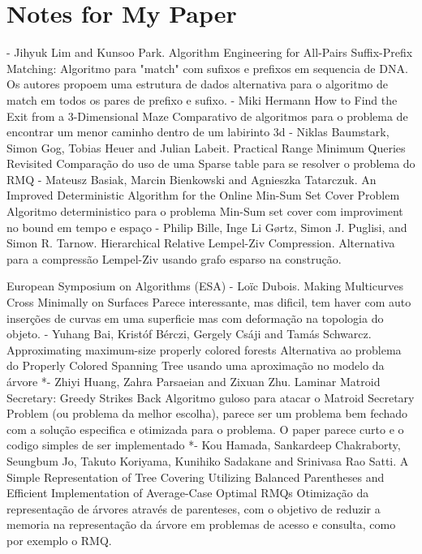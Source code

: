 \documentclass[12pt]{article}
\begin{document}
\section*{Notes for My Paper}

- Jihyuk Lim and Kunsoo Park. Algorithm Engineering for All-Pairs Suffix-Prefix Matching:
    Algoritmo para "match" com sufixos e prefixos em sequencia de DNA. Os autores propoem uma estrutura de dados alternativa
    para o algoritmo de match em todos os pares de prefixo e sufixo. 
- Miki Hermann How to Find the Exit from a 3-Dimensional Maze
    Comparativo de algoritmos para o problema de encontrar um menor caminho dentro de um labirinto 3d
- Niklas Baumstark, Simon Gog, Tobias Heuer and Julian Labeit. Practical Range Minimum Queries Revisited
    Comparação do uso de uma Sparse table para se resolver o problema do RMQ
- Mateusz Basiak, Marcin Bienkowski and Agnieszka Tatarczuk. An Improved Deterministic Algorithm for the Online Min-Sum Set Cover Problem
    Algoritmo deterministico para o problema Min-Sum set cover com improviment no bound em tempo e espaço
- Philip Bille, Inge Li Gørtz, Simon J. Puglisi, and Simon R. Tarnow. Hierarchical Relative Lempel-Ziv Compression.
    Alternativa para a compressão Lempel-Ziv usando grafo esparso na construção.

European Symposium on Algorithms (ESA) 
- Loïc Dubois. Making Multicurves Cross Minimally on Surfaces 
   Parece interessante, mas dificil, tem haver com auto inserções de curvas em uma superficie mas com deformação na topologia do objeto.
- Yuhang Bai, Kristóf Bérczi, Gergely Csáji and Tamás Schwarcz. Approximating maximum-size properly colored forests
   Alternativa ao problema do Properly Colored Spanning Tree usando uma aproximação no modelo da árvore
*- Zhiyi Huang, Zahra Parsaeian and Zixuan Zhu. Laminar Matroid Secretary: Greedy Strikes Back
   Algoritmo guloso para atacar o Matroid Secretary Problem (ou problema da melhor escolha), parece ser um problema bem fechado com a solução especifica e otimizada para o problema.
   O paper parece curto e o codigo simples de ser implementado
*- Kou Hamada, Sankardeep Chakraborty, Seungbum Jo, Takuto Koriyama, Kunihiko Sadakane and Srinivasa Rao Satti. A Simple Representation of Tree Covering Utilizing Balanced Parentheses and Efficient Implementation of Average-Case Optimal RMQs
   Otimização da representação de árvores através de parenteses, com o objetivo de reduzir a memoria na representação da árvore em problemas de acesso e consulta, como por exemplo o RMQ.
\end{document}
